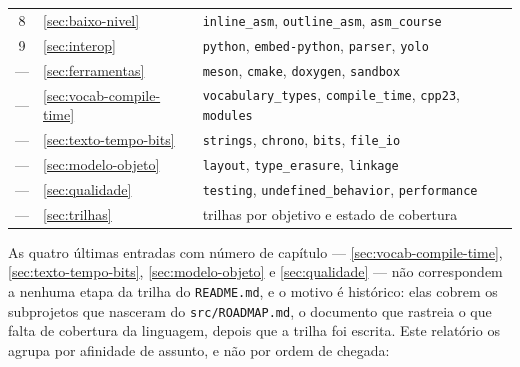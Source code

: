\begin{table}[htbp]
\begin{tabular}{@{}clp{}@{}}
8 & \cref{sec:baixo-nivel}  & \texttt{inline\_asm}, \texttt{outline\_asm},
                               \texttt{asm\_course} \\
9 & \cref{sec:interop}      & \texttt{python}, \texttt{embed-python},
                               \texttt{parser}, \texttt{yolo} \\
--- & \cref{sec:ferramentas} & \texttt{meson}, \texttt{cmake},
                               \texttt{doxygen}, \texttt{sandbox} \\
--- & \cref{sec:vocab-compile-time} & \texttt{vocabulary\_types},
                               \texttt{compile\_time}, \texttt{cpp23},
                               \texttt{modules} \\
--- & \cref{sec:texto-tempo-bits} & \texttt{strings}, \texttt{chrono},
                               \texttt{bits}, \texttt{file\_io} \\
--- & \cref{sec:modelo-objeto} & \texttt{layout}, \texttt{type\_erasure},
                               \texttt{linkage} \\
--- & \cref{sec:qualidade}   & \texttt{testing}, \texttt{undefined\_behavior},
                               \texttt{performance} \\
--- & \cref{sec:trilhas}    & trilhas por objetivo e estado de cobertura \\
\bottomrule
\end{tabular}
\end{table}

As quatro últimas entradas com número de capítulo --- \cref{sec:vocab-compile-time},
\cref{sec:texto-tempo-bits}, \cref{sec:modelo-objeto} e \cref{sec:qualidade} ---
não correspondem a nenhuma etapa da trilha do \texttt{README.md}, e o motivo é
histórico: elas cobrem os subprojetos que nasceram do \texttt{src/ROADMAP.md},
o documento que rastreia o que falta de cobertura da linguagem, depois que a
trilha foi escrita. Este relatório os agrupa por afinidade de assunto, e não
por ordem de chegada:

